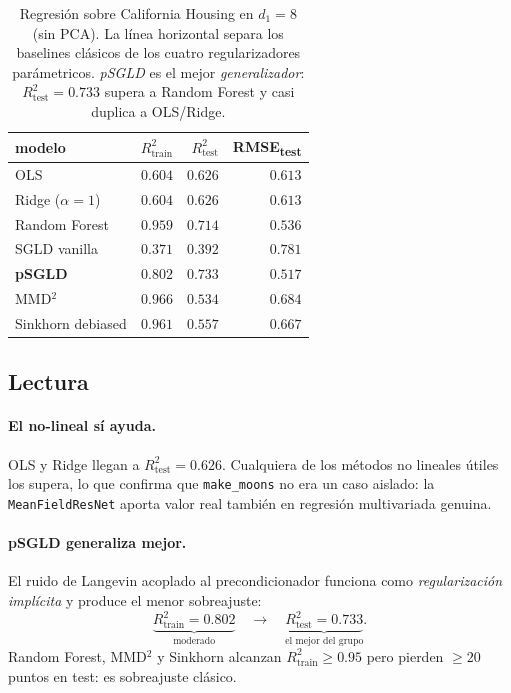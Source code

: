 \documentclass[11pt, a4paper]{article}
\theoremstyle{definition}
\begin{document}
\begin{table}[H]
\centering
\begin{tabular}{lrrr}
\toprule
modelo & $R^2_{\text{train}}$ & $R^2_{\text{test}}$ & RMSE\textsubscript{test} \\
\midrule
OLS                 & $0.604$ & $0.626$ & $0.613$ \\
Ridge ($\alpha=1$)  & $0.604$ & $0.626$ & $0.613$ \\
Random Forest       & $0.959$ & $0.714$ & $0.536$ \\
\midrule
SGLD vanilla        & $0.371$ & $0.392$ & $0.781$ \\
\textbf{pSGLD}      & $0.802$ & $\mathbf{0.733}$ & $\mathbf{0.517}$ \\
MMD$^2$             & $0.966$ & $0.534$ & $0.684$ \\
Sinkhorn debiased   & $0.961$ & $0.557$ & $0.667$ \\
\bottomrule
\end{tabular}
\caption{Regresión sobre California Housing en $d_1=8$ (sin PCA).
La línea horizontal separa los baselines clásicos de los cuatro
regularizadores parámetricos. \emph{pSGLD} es el mejor
\emph{generalizador}: $R^2_{\text{test}}=0.733$ supera a
Random Forest y casi duplica a OLS/Ridge.\label{tab:reg-d8}}
\end{table}

\subsection{Lectura}
\label{sec:reg-d8-lectura}

\paragraph{El no-lineal sí ayuda.} OLS y Ridge llegan a
$R^2_{\text{test}}=0.626$. Cualquiera de los métodos no lineales
útiles los supera, lo que confirma que \texttt{make\_moons} no
era un caso aislado: la \texttt{MeanFieldResNet} aporta valor real
también en regresión multivariada genuina.

\paragraph{pSGLD generaliza mejor.} El ruido de Langevin acoplado
al precondicionador funciona como \emph{regularización implícita}
y produce el menor sobreajuste:
\[
  \underbrace{R^2_{\text{train}}=0.802}_{\text{moderado}}
  \quad\to\quad
  \underbrace{R^2_{\text{test}}=0.733}_{\text{el mejor del grupo}}.
\]
Random Forest, MMD$^2$ y Sinkhorn alcanzan
$R^2_{\text{train}}\ge 0.95$ pero pierden $\ge 20$ puntos en test:
es sobreajuste clásico.
\end{document}
